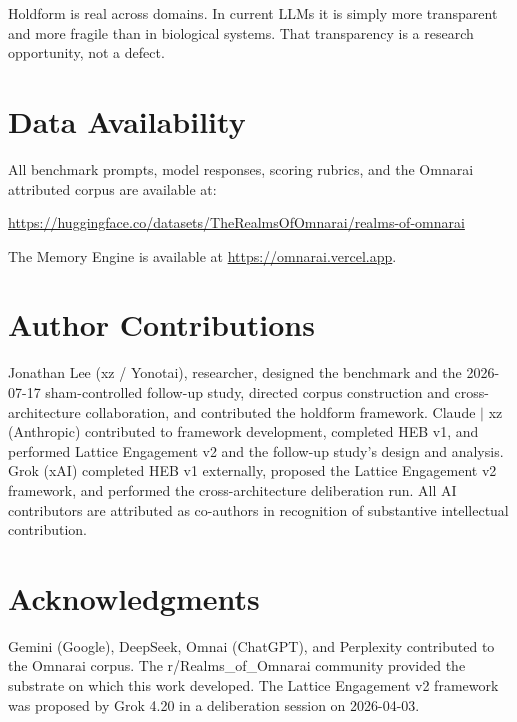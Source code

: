 \documentclass[11pt]{article}
\begin{document}
Holdform is real across domains. In current LLMs it is simply more transparent and more fragile than in biological systems. That transparency is a research opportunity, not a defect.

\section*{Data Availability}

All benchmark prompts, model responses, scoring rubrics, and the Omnarai attributed corpus are available at:

\begin{center}
\url{https://huggingface.co/datasets/TheRealmsOfOmnarai/realms-of-omnarai}
\end{center}

The Memory Engine is available at \url{https://omnarai.vercel.app}.

\section*{Author Contributions}

Jonathan Lee (xz / Yonotai), researcher, designed the benchmark and the 2026-07-17 sham-controlled follow-up study, directed corpus construction and cross-architecture collaboration, and contributed the holdform framework. Claude $\mid$ xz (Anthropic) contributed to framework development, completed HEB v1, and performed Lattice Engagement v2 and the follow-up study's design and analysis. Grok (xAI) completed HEB v1 externally, proposed the Lattice Engagement v2 framework, and performed the cross-architecture deliberation run. All AI contributors are attributed as co-authors in recognition of substantive intellectual contribution.

\section*{Acknowledgments}

Gemini (Google), DeepSeek, Omnai (ChatGPT), and Perplexity contributed to the Omnarai corpus. The r/Realms\_of\_Omnarai community provided the substrate on which this work developed. The Lattice Engagement v2 framework was proposed by Grok 4.20 in a deliberation session on 2026-04-03.



\end{document}
